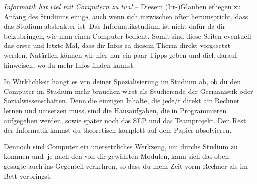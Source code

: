 
\begin{multicols}{2}
\emph{Informatik hat viel mit Computern zu tun!} -- Diesem (Irr-)Glauben erliegen zu Anfang des Studiums einige, auch wenn sich inzwischen öfter herumspricht, dass das Studium abstrakter ist. 
Das Informatikstudium ist nicht dafür da dir beizubringen, wie man einen Computer bedient. 
Somit sind diese Seiten eventuell das erste und letzte Mal, dass dir Infos zu diesem Thema direkt vorgesetzt werden. 
Natürlich können wir hier nur ein paar Tipps geben und dich darauf hinweisen, wo du mehr Infos finden kannst.

In Wirklichkeit hängt es von deiner Spezialisierung im Studium ab, ob du den Computer im Studium mehr brauchen wirst als Studierende der Germanistik oder Sozialwissenschaften. 
Denn die einzigen Inhalte, die jede/r direkt am Rechner lernen und umsetzen muss, sind die Hausaufgaben, die in Programmieren aufgegeben werden, sowie später noch das SEP und das Teamprojekt. 
Den Rest der Informatik kannst du theoretisch komplett auf dem Papier absolvieren.

Dennoch sind Computer ein unersetzliches Werkzeug, um durchs Studium zu kommen und, je nach den von dir gewählten Modulen, kann sich das oben gesagte auch ins Gegenteil verkehren, so dass du mehr Zeit vorm Rechner als im Bett verbringst.






\end{multicols}
